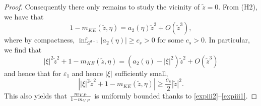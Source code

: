 \documentclass[11pt]{amsart}
\numberwithin{equation}{section}
\newcommand{\eps}{\varepsilon}
\begin{document}
\begin{proof}
   Consequently there only remains to study the vicinity of $\tilde z = 0$. From (H2), we have that
   \begin{equation}
   \label{expiii1} 1-  m_{KE}(\tilde z, \eta) = a_{2}(\eta) \tilde z^2 + O(\tilde{z}^3),
   \end{equation}
  where by compactness,  $ \inf_{ \mathbb{S}^{d-1}}   |a_{2}(\eta)| \geq c_{s} >0$ for some $c_{s}>0$.
    In particular, we find that
$$ |\xi|^2 \tilde z^2 + 1 -  m_{KE}(\tilde z, \eta) = (a_{2}(\eta) -  |\xi|^2 ) \tilde z^2  + O(\tilde{z}^3)$$
 and hence that for $\eps_{1}$ and hence $|\xi|$ sufficiently small, 
 $$ \left| |\xi|^2 \tilde z^2 + 1 -  m_{KE}(\tilde z, \eta) \right| \geq \frac{c_s}{2} |\tilde{z}|^2.$$
  This also yields that $m_{VP} \over 1-m_{VP}$ is uniformly bounded thanks to 
   \eqref{expiii2}--\eqref{expiii1}.
 


\end{proof}
\end{document}
